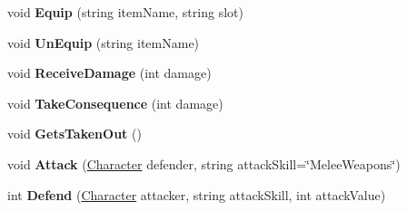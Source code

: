 \begin{DoxyCompactItemize}
\item 
\hypertarget{class_dungeon_crawler_1_1_character_1_1_character_a60ed0daf6e2a281318dc35effe82566c}{}void {\bfseries Equip} (string item\+Name, string slot)\label{class_dungeon_crawler_1_1_character_1_1_character_a60ed0daf6e2a281318dc35effe82566c}

\item 
\hypertarget{class_dungeon_crawler_1_1_character_1_1_character_a625216059f7c3d1dfa61bd93ac32c8be}{}void {\bfseries Un\+Equip} (string item\+Name)\label{class_dungeon_crawler_1_1_character_1_1_character_a625216059f7c3d1dfa61bd93ac32c8be}

\item 
\hypertarget{class_dungeon_crawler_1_1_character_1_1_character_af4d0724811374b91bb6257b4fef2cb9a}{}void {\bfseries Receive\+Damage} (int damage)\label{class_dungeon_crawler_1_1_character_1_1_character_af4d0724811374b91bb6257b4fef2cb9a}

\item 
\hypertarget{class_dungeon_crawler_1_1_character_1_1_character_a6c2305e906fbcf5b7bd581c7f695318d}{}void {\bfseries Take\+Consequence} (int damage)\label{class_dungeon_crawler_1_1_character_1_1_character_a6c2305e906fbcf5b7bd581c7f695318d}

\item 
\hypertarget{class_dungeon_crawler_1_1_character_1_1_character_ae2d528e5a50f9cc930a8d1561800ec75}{}void {\bfseries Gets\+Taken\+Out} ()\label{class_dungeon_crawler_1_1_character_1_1_character_ae2d528e5a50f9cc930a8d1561800ec75}

\item 
\hypertarget{class_dungeon_crawler_1_1_character_1_1_character_a30c222f247a9a27fb69d5cb3cb9f5b30}{}void {\bfseries Attack} (\hyperlink{class_dungeon_crawler_1_1_character_1_1_character}{Character} defender, string attack\+Skill=\char`\"{}Melee\+Weapons\char`\"{})\label{class_dungeon_crawler_1_1_character_1_1_character_a30c222f247a9a27fb69d5cb3cb9f5b30}

\item 
\hypertarget{class_dungeon_crawler_1_1_character_1_1_character_a0fae904150f11f772ee3d837afd0d9cc}{}int {\bfseries Defend} (\hyperlink{class_dungeon_crawler_1_1_character_1_1_character}{Character} attacker, string attack\+Skill, int attack\+Value)\label{class_dungeon_crawler_1_1_character_1_1_character_a0fae904150f11f772ee3d837afd0d9cc}

\end{DoxyCompactItemize}
